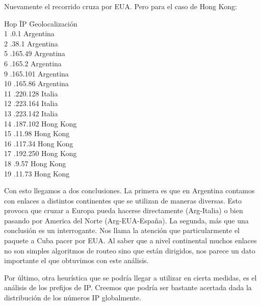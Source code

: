 \documentclass[%
	final,
	narroweqnarray,
	inline,
	twoside,
	]{ieee}
\begin{document}
Nuevamente el recorrido cruza por EUA. Pero para el caso de Hong Kong:

\begin{tabbing}
Hop \=IP	\hspace*{2cm}			 	\=Geolocalización\\
1  .0.1     \> Argentina \\
2  .38.1    \> Argentina \\
5  .165.49   \> Argentina \\
6  .165.2    \> Argentina \\
9  .165.101  \> Argentina \\
10 .165.86   \> Argentina \\
11 .220.128  \> Italia \\
12 .223.164  \> Italia \\
13 .223.142  \> Italia \\
14 .187.102 \> Hong Kong \\
15 .11.98    \> Hong Kong \\
16 .117.34  \> Hong Kong \\
17 .192.250 \> Hong Kong \\
18 .9.57    \> Hong Kong \\
19 .11.73 	\> Hong Kong \\
\end{tabbing}

Con esto llegamos a dos conclusiones. La primera es que en Argentina contamos con enlaces a distintos continentes que se utilizan de maneras diversas. Esto provoca que cruzar a Europa pueda hacerse directamente (Arg-Italia) o bien pasando por America del Norte (Arg-EUA-España).
La segunda, más que una conclusión es un interrogante. Nos llama la atención que particularmente el paquete a Cuba pacer por EUA. Al saber que a nivel continental muchos enlaces no son simples algoritmos de routeo sino que están dirigidos, nos parece un dato importante el que obtuvimos con este análisis.

Por último, otra heurística que se podría llegar a utilizar en cierta medidas, es el análisis de los prefijos de IP. Creemos que podría ser bastante acertada dada la distribución de los números IP globalmente.
\end{document}
